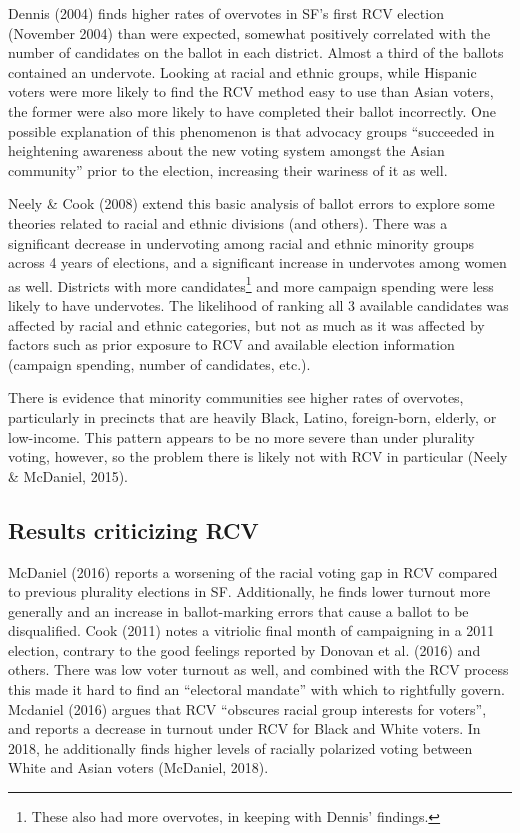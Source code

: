 \documentclass[12pt,twoside]{reedthesis}
\begin{document}
Dennis (2004) finds higher rates of overvotes in SF's first RCV election (November 2004) than were expected, somewhat positively correlated with the number of candidates on the ballot in each district. Almost a third of the ballots contained an undervote. Looking at racial and ethnic groups, while Hispanic voters were more likely to find the RCV method easy to use than Asian voters, the former were also more likely to have completed their ballot incorrectly. One possible explanation of this phenomenon is that advocacy groups ``succeeded in heightening awareness about the new voting system amongst the Asian community'' prior to the election, increasing their wariness of it as well.

Neely \& Cook (2008) extend this basic analysis of ballot errors to explore some theories related to racial and ethnic divisions (and others). There was a significant decrease in undervoting among racial and ethnic minority groups across 4 years of elections, and a significant increase in undervotes among women as well. Districts with more candidates\footnote{These also had more overvotes, in keeping with Dennis' findings.} and more campaign spending were less likely to have undervotes. The likelihood of ranking all 3 available candidates was affected by racial and ethnic categories, but not as much as it was affected by factors such as prior exposure to RCV and available election information (campaign spending, number of candidates, etc.).

There is evidence that minority communities see higher rates of overvotes, particularly in precincts that are heavily Black, Latino, foreign-born, elderly, or low-income. This pattern appears to be no more severe than under plurality voting, however, so the problem there is likely not with RCV in particular (Neely \& McDaniel, 2015).

\hypertarget{results-criticizing-rcv}{%
\subsection{Results criticizing RCV}\label{results-criticizing-rcv}}

McDaniel (2016) reports a worsening of the racial voting gap in RCV compared to previous plurality elections in SF. Additionally, he finds lower turnout more generally and an increase in ballot-marking errors that cause a ballot to be disqualified. Cook (2011) notes a vitriolic final month of campaigning in a 2011 election, contrary to the good feelings reported by Donovan et al. (2016) and others. There was low voter turnout as well, and combined with the RCV process this made it hard to find an ``electoral mandate'' with which to rightfully govern. Mcdaniel (2016) argues that RCV ``obscures racial group interests for voters'', and reports a decrease in turnout under RCV for Black and White voters. In 2018, he additionally finds higher levels of racially polarized voting between White and Asian voters (McDaniel, 2018).
\end{document}
